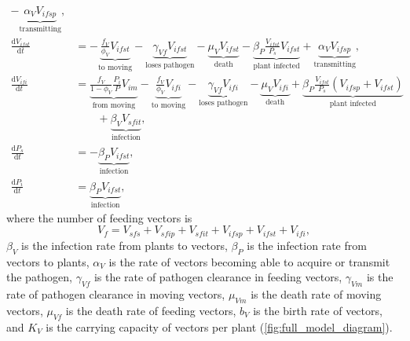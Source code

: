 \documentclass{article}
\newcommand{\md}{\mathrm{d}}
\begin{document}
\begin{equation}
\begin{split}
    - \underbrace{\alpha_V V_{ifsp}}_{\text{transmitting}},
    \\
    \frac{\md V_{ifst}}{\md t}
    &=
    - \underbrace{\frac{f_V}{\phi_V} V_{ifst}}_{\text{to moving}}
    - \underbrace{\gamma_{Vf} V_{ifst}}_{\text{loses pathogen}}
    - \underbrace{\mu_V V_{ifst}}_{\text{death}}
    - \underbrace{\beta_P \frac{V_{ifst}}{P_s} V_{ifst}}_{\text{plant infected}}
    + \underbrace{\alpha_V V_{ifsp}}_{\text{transmitting}},
    \\
    \frac{\md V_{ifi}}{\md t}
    &=
    \underbrace{\frac{f_V}{1 - \phi_V} \frac{P_i}{P} V_{im}}_{\text{from moving}}
    - \underbrace{\frac{f_V}{\phi_V} V_{ifi}}_{\text{to moving}}
    - \underbrace{\gamma_{Vf} V_{ifi}}_{\text{loses pathogen}}
    - \underbrace{\mu_V V_{ifi}}_{\text{death}}
    + \underbrace{\beta_P \frac{V_{ifst}}{P_s} (V_{ifsp} + V_{ifst})}_{\text{plant infected}}
    \\ & \quad\quad {}
    + \underbrace{\beta_V V_{sfit}}_{\text{infection}},
    \\
    \frac{\md P_s}{\md t}
    &=
    - \underbrace{\beta_P V_{ifst}}_{\text{infection}},
    \\
    \frac{\md P_i}{\md t}
    &=
    \underbrace{\beta_P V_{ifst}}_{\text{infection}},
  \end{split}
\end{equation}
where the number of feeding vectors is
\begin{equation}
  V_f = V_{sfs} + V_{sfip} + V_{sfit} + V_{ifsp} + V_{ifst} + V_{ifi},
\end{equation}
$\beta_V$ is the infection rate from plants to vectors, $\beta_P$ is
the infection rate from vectors to plants, $\alpha_V$ is the rate of
vectors becoming able to acquire or transmit the pathogen,
$\gamma_{Vf}$ is the rate of pathogen clearance in feeding vectors,
$\gamma_{Vm}$ is the rate of pathogen clearance in moving vectors,
$\mu_{Vm}$ is the death rate of moving vectors, $\mu_{Vf}$ is the
death rate of feeding vectors, $b_V$ is the birth rate of vectors, and
$K_V$ is the carrying capacity of vectors per plant
(\autoref{fig:full_model_diagram}).
\end{document}
